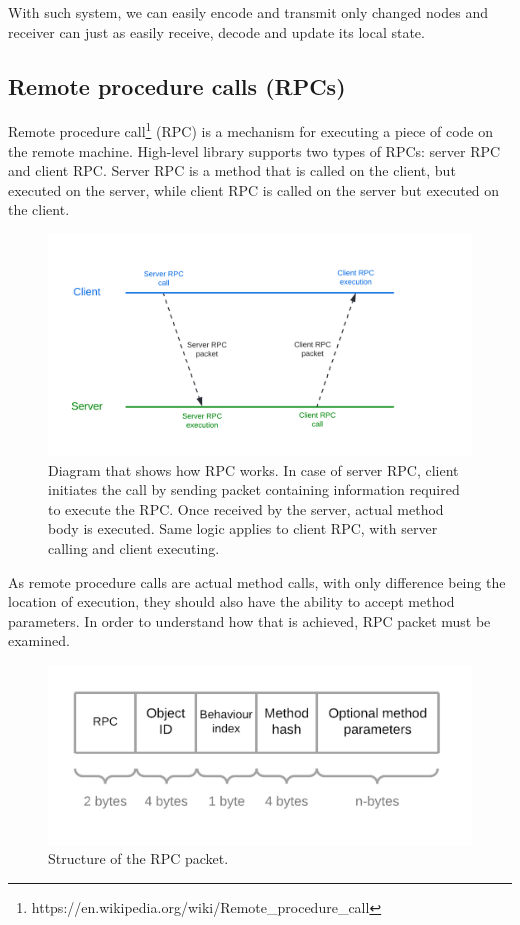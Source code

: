 \documentclass[times, utf8, diplomski]{fer}
\begin{document}
With such system, we can easily encode and transmit only changed nodes and receiver can just as easily receive, decode and update its local state.

\subsection{Remote procedure calls (RPCs)}
Remote procedure call\footnote{https://en.wikipedia.org/wiki/Remote\_procedure\_call} (RPC) is a mechanism for executing a piece of code on the remote machine. High-level library supports two types of RPCs: server RPC and client RPC. Server RPC is a method that is called on the client, but executed on the server, while client RPC is called on the server but executed on the client.

\begin{figure}[H]
	\centering
	\includegraphics[scale=0.25]{NetworkBehavior-RPC-diagram}
	\caption{Diagram that shows how RPC works. In case of server RPC, client initiates the call by sending packet containing information required to execute the RPC. Once received by the server, actual method body is executed. Same logic applies to client RPC, with server calling and client executing.}
\end{figure}

As remote procedure calls are actual method calls, with only difference being the location of execution, they should also have the ability to accept method parameters. In order to understand how that is achieved, RPC packet must be examined.

\begin{figure}[H]
	\centering
	\includegraphics[scale=0.3]{NetworkBehavior-RPC-packet-structure}
	\caption{Structure of the RPC packet.}
\end{figure}
\end{document}
